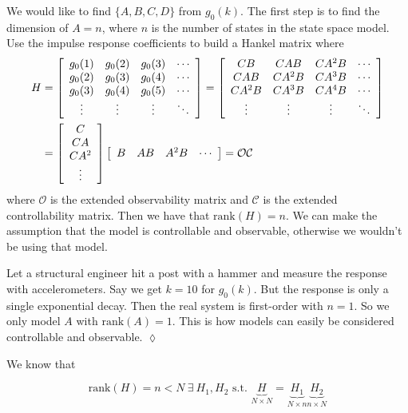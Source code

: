 We would like to find $\{A,B,C,D\}$ from $g_0(k)$.
The first step is to find the dimension of $A=n$, where $n$ is the number of states in the state space model.
Use the impulse response coefficients to build a Hankel matrix where
\begin{align*}
H &= \left[\begin{array}{c c c c} g_0(1) & g_0(2) & g_0(3) & \cdots \\ g_0(2) & g_0(3) & g_0(4) & \cdots \\ g_0(3) & g_0(4) & g_0(5) & \cdots \\ \vdots & \vdots & \vdots & \ddots \end{array}\right]
= \left[\begin{array}{c c c c} CB & CAB & CA^2B & \cdots \\ CAB & CA^2B & CA^3B & \cdots \\ CA^2B & CA^3B & CA^4B & \cdots \\ \vdots & \vdots & \vdots & \ddots \end{array}\right] \\
&= \left[\begin{array}{c} C \\ CA \\ CA^2 \\ \vdots \end{array}\right] \left[\begin{array}{c c c c} B & AB & A^2B & \cdots \end{array}\right] = \mathcal{O}\mathcal{C}
\end{align*}
where $\mathcal{O}$ is the extended observability matrix and $\mathcal{C}$ is the extended controllability matrix.
Then we have that $\text{rank}(H)=n$.
We can make the assumption that the model is controllable and observable, otherwise we wouldn't be using that model.

\begin{example}
Let a structural engineer hit a post with a hammer and measure the response with accelerometers.
Say we get $k=10$ for $g_0(k)$.
But the response is only a single exponential decay.
Then the real system is first-order with $n=1$.
So we only model $A$ with $\text{rank}(A)=1$.
This is how models can easily be considered controllable and observable.
$\lozenge$
\end{example}

We know that

\begin{equation*}
\text{rank}(H)=n<N~\exists~H_1, H_2 \text{~s.t.~} \underbrace{H}_{N\times N} = \underbrace{H_1}_{N\times n} \underbrace{H_2}_{n\times N}
\end{equation*}


